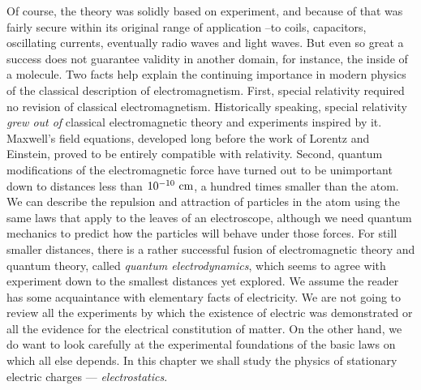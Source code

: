 Of course, the theory was solidly based on experiment, and
because of that was fairly secure within its original range of application --to
coils, capacitors, oscillating currents, eventually radio waves and light
waves. But even so great a success does not guarantee validity in another
domain, for instance, the inside of a molecule.
Two facts help explain the continuing importance in modern
physics of the classical description of electromagnetism. First, special
relativity required no revision of classical electromagnetism. Historically
speaking, special relativity \emph{grew out of} classical electromagnetic
theory and experiments inspired by it. Maxwell's field equations, developed
long before the work of Lorentz and Einstein, proved to be entirely compatible
with relativity. Second, quantum modifications of the electromagnetic force
have turned out to be unimportant down to distances less than $10^{-10}\ \textup{cm}$, a
hundred times smaller than the atom. We can describe the repulsion and
attraction of particles in the atom using the same laws that apply to the
leaves of an electroscope, although we need quantum mechanics to predict how
the particles will behave under those forces. For still smaller distances,
there is a rather successful fusion of electromagnetic theory and quantum
theory, called \emph{quantum electrodynamics}, which seems to agree with
experiment down to the smallest distances yet explored. 
We assume the reader has some acquaintance with elementary
facts of electricity. We are not going to review all the experiments by which
the existence of electric was demonstrated or all the evidence for the
electrical constitution of matter. On the other hand, we do want to look
carefully at the experimental foundations of the basic laws on which all else
depends. In this chapter we shall study the physics of stationary electric
charges --- \emph{electrostatics}.


